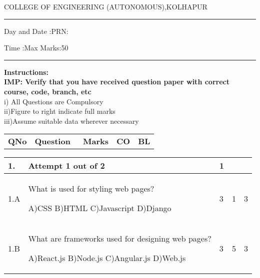 \documentclass[12pt]{article}
\begin{document}
	\par
	COLLEGE OF ENGINEERING (AUTONOMOUS),KOLHAPUR
	\par\noindent\rule{\textwidth}{0.4pt}
	
	\centering{}\par
	\centering{}\par
	\par
	\begin{flushleft}
		Day and Date :{}\hspace{5.5cm}PRN:
	\end{flushleft}
	
	\begin{flushleft}
		Time :{}\hspace{3cm}Max Marks:{50}\\
	\end{flushleft}
	\noindent\rule{\textwidth}{0.1pt}
\begin{flushleft}
	{\bf Instructions:}\\
	{\hspace{0.5cm} \bf IMP: Verify that you have received question paper with correct course, code, branch, etc}\\
	\hspace{1cm}i) All Questions are Compulsory\\
	\hspace{1cm}ii)Figure to right indicate full marks\\
	\hspace{1cm}iii)Assume suitable data wherever necessary\\
\end{flushleft}

\begin{tabular}{L{1cm}C{9cm}C{2cm}C{2cm}C{1cm}}
	\bf{QNo} & 
	\bf{Question}\
	
	&
	\bf{Marks}&
	\bf{CO}&
	\bf{BL}
	
	
	
	
\end{tabular} 
	\begin{tabular}{|L{1cm}|L{9cm}|C{2cm}|C{2cm}|C{1cm}|}
		1. & Attempt 1 out of 2 & 1  & & \\ \hline
				1.A & What is used for styling web pages? \newline
		
		A)CSS\newline
		B)HTML\newline
		C)Javascript\newline
		D)Django &
		3 &
		1&
		3 \\ \hline
		
				1.B & What are frameworks used for designing web pages? \newline
		
		A)React.js\newline
		B)Node.js\newline
		C)Angular.js\newline
		D)Web.js &
		3 &
		5&
		3 \\ \hline
		
		
	\end{tabular}
\end{document}
